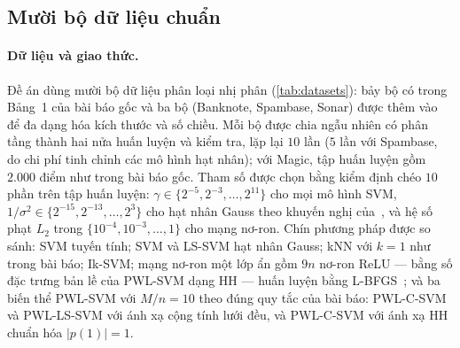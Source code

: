 \subsection{Mười bộ dữ liệu chuẩn}\label{sec:bench10}

\paragraph{Dữ liệu và giao thức.} Đề án dùng mười bộ dữ liệu phân loại nhị phân (\cref{tab:datasets}): bảy bộ có trong Bảng~1 của bài báo gốc và ba bộ (Banknote, Spambase, Sonar) được thêm vào để đa dạng hóa kích thước và số chiều. Mỗi bộ được chia ngẫu nhiên có phân tầng thành hai nửa huấn luyện và kiểm tra, lặp lại $10$ lần ($5$ lần với Spambase, do chi phí tinh chỉnh các mô hình hạt nhân); với Magic, tập huấn luyện gồm $2.000$ điểm như trong bài báo gốc. Tham số được chọn bằng kiểm định chéo $10$ phần trên tập huấn luyện: $\gamma\in\{2^{-5},2^{-3},\dots,2^{11}\}$ cho mọi mô hình SVM, $1/\sigma^2\in\{2^{-15},2^{-13},\dots,2^{3}\}$ cho hạt nhân Gauss theo khuyến nghị của~\cite{hsu2003}, và hệ số phạt $L_2$ trong $\{10^{-4},10^{-3},\dots,1\}$ cho mạng nơ-ron. Chín phương pháp được so sánh: SVM tuyến tính; SVM và LS-SVM hạt nhân Gauss; kNN với $k=1$ như trong bài báo; Ik-SVM; mạng nơ-ron một lớp ẩn gồm $9n$ nơ-ron ReLU --- bằng số đặc trưng bản lề của PWL-SVM dạng HH --- huấn luyện bằng L-BFGS~\cite{liu1989}; và ba biến thể PWL-SVM với $M/n=10$ theo đúng quy tắc của bài báo: PWL-C-SVM và PWL-LS-SVM với ánh xạ cộng tính lưới đều, và PWL-C-SVM với ánh xạ HH chuẩn hóa $|p(1)|=1$.







